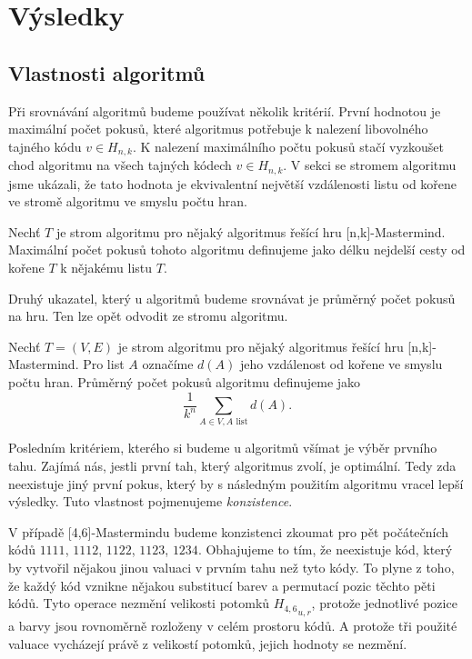 \chapter{Výsledky}

\section{Vlastnosti algoritmů}
Při srovnávání algoritmů budeme používat několik kritérií. První hodnotou je maximální počet pokusů, které algoritmus potřebuje k nalezení libovolného tajného kódu $v \in H_{n,k}$. K nalezení maximálního počtu pokusů stačí vyzkoušet chod algoritmu na všech tajných kódech $v \in H_{n,k}$. V sekci se stromem algoritmu jsme ukázali, že tato hodnota je ekvivalentní největší vzdálenosti listu od kořene ve stromě algoritmu ve smyslu počtu hran.

\begin{definice}\label{defmaxpocetpokusu}
    Nechť $T$ je strom algoritmu pro nějaký algoritmus řešící hru [n,k]-Mastermind. Maximální počet pokusů tohoto algoritmu definujeme jako délku nejdelší cesty od kořene $T$ k nějakému listu $T$. 
\end{definice}

Druhý ukazatel, který u algoritmů budeme srovnávat je průměrný počet pokusů na hru. Ten lze opět odvodit ze stromu algoritmu.

\begin{definice}\label{defprumpocetpokusu}
    Nechť $T = (V,E)$ je strom algoritmu pro nějaký algoritmus řešící hru [n,k]-Mastermind. Pro list $A$ označíme $d(A)$ jeho vzdálenost od kořene ve smyslu počtu hran. Průměrný počet pokusů algoritmu definujeme jako 
    \[\frac{1}{k^n}\sum_{A\in V, A \text{ list}} d(A).\]
\end{definice}

Posledním kritériem, kterého si budeme u algoritmů všímat je výběr prvního tahu. Zajímá nás, jestli první tah, který algoritmus zvolí, je optimální. Tedy zda neexistuje jiný první pokus, který by s následným použitím algoritmu vracel lepší výsledky. Tuto vlastnost pojmenujeme \emph{konzistence}.

V případě [4,6]-Mastermindu budeme konzistenci zkoumat pro pět počátečních kódů $1111$, $1112$, $1122$, $1123$, $1234$. Obhajujeme to tím, že neexistuje kód, který by vytvořil nějakou jinou valuaci v prvním tahu než tyto kódy. To plyne z toho, že každý kód vznikne nějakou substitucí barev a permutací pozic těchto pěti kódů. Tyto operace nezmění velikosti potomků ${H_{4,6}}_{u,r}$, protože jednotlivé pozice a barvy jsou rovnoměrně rozloženy v celém prostoru kódů. A protože tři použité valuace vycházejí právě z velikostí potomků, jejich hodnoty se nezmění.

